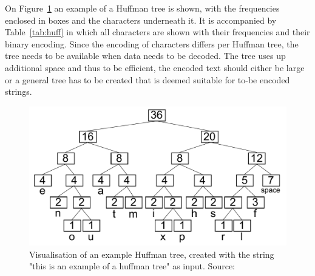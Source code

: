 On Figure~\ref{fig:huffman} an example of a Huffman tree is shown, with the frequencies enclosed in boxes and the characters underneath it.
It is accompanied by Table~\ref{tab:huff} in which all characters are shown with their frequencies and their binary encoding.
Since the encoding of characters differs per Huffman tree, the tree needs to be available when data needs to be decoded.
The tree uses up additional space and thus to be efficient, the encoded text should either be large or a general tree has to be created that is deemed suitable for to-be encoded strings.

\begin{figure}[h!]
    \centering
        \includegraphics[scale=0.5]{figs/related_work/huffman.pdf}
    \caption{Visualisation of an example Huffman tree, created with the string "this is an example of a huffman tree" as input. Source: \citet{Dcoetzee2007}}
    \label{fig:huffman}
\end{figure}

